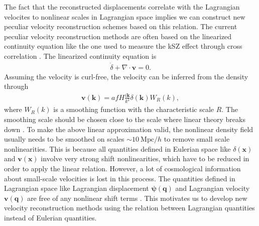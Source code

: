 \documentclass[aps,prd,twocolumn,superscriptaddress,groupedaddress,nofootinbib,amsfont]{revtex4}  %
\newcommand{\mr}{\mathrm}
\newcommand{\bea}{\begin{eqnarray}}
\newcommand{\eea}{\end{eqnarray}}
\newcommand{\bmp}{\bm{\psi}}
\newcommand{\bmv}{\bm{v}}
\newcommand{\bmk}{\bm{k}}
\newcommand{\bmx}{\bm{x}}
\newcommand{\bmq}{\bm{q}}
\begin{document}
The fact that the reconstructed displacements correlate with the Lagrangian 
velocites to nonlinear scales in Lagrangian space implies we can construct
new peculiar velocity reconstruction schemes based on this relation.
The current peculiar velocity reconstruction methods are often based on the 
linearized continuity equation like the one used to measure the kSZ effect 
through cross correlation \cite{2016PVR}. 
The linearized continuity equation is 
\bea
\dot{\delta}+\nabla\cdot\bmv=0.
\eea
Assuming the velocity is curl-free, the velocity can be inferred from the 
density through
\bea
\bmv(\bmk)=afH\frac{i\bmk}{k^2}\delta(\bmk)W_R(k),
\eea
where $W_R(k)$ is a smoothing function with the characteristic scale $R$.
The smoothing scale should be chosen close to the scale where linear theory 
breaks down \cite{2015marcel,2015BAOsm,2016Seo}. 
To make the above linear approximation valid, the nonlinear density field 
usually needs to be smoothed on scales $\sim10\ \mr{Mpc}/h$ to remove small
scale nonlinearities. This is because all quantities defined in Eulerian space
like $\delta(\bmx)$ and $\bmv(\bmx)$ involve very strong shift nonlinearities,
which have to be reduced in order to apply the linear relation. 
However, a lot of cosmological information about small-scale velocities is lost 
in this process. The quantities defined in Lagrangian space like Lagrangian 
displacement $\bmp(\bmq)$ and Lagrangian velocity $\bmv(\bmq)$ are free of any
nonlinear shift terms \cite{2016BSZ}.
This motivates us to develop new velocity reconstruction methods using the 
relation between Lagrangian quantities instead of Eulerian quantities.
\end{document}
